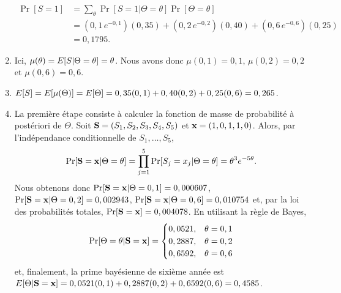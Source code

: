 \begin{exercice}
\begin{sol}
\begin{enumerate}
      \begin{align*}
        \Pr[S = 1] &= \sum_{\theta} \Pr[S=1|\Theta = \theta]
        \Pr[\Theta = \theta] \\
        &= (0,1\, e^{-0,1}) (0,35) + (0,2\, e^{-0,2}) (0,40) +
        (0,6\, e^{-0,6}) (0,25) \\
        &= 0,1795.
      \end{align*}
    \item Ici, $\mu(\theta) = E [ S|\Theta = \theta ] = \theta$. Nous
      avons donc $\mu(0,1) = 0,1$, $\mu(0,2) = 0,2$ et
      $\mu(0,6) = 0,6$.
    \item $E [ S ] = E [ \mu(\Theta) ] = E [ \Theta ] = 0,35 (0,1) +
      0,40 (0,2) + 0,25(0,6) = 0,265$.
    \item La première étape consiste à calculer la fonction de masse
      de probabilité à postériori de $\Theta$. Soit $\mathbf{S} = (S_1,
      S_2, S_3, S_4, S_5)$ et $\mathbf{x} = (1, 0, 1, 1, 0)$. Alors, par
      l'indépendance conditionnelle de $S_1, \dots, S_5$,
      \begin{equation*}
        \Pr[\mathbf{S} = \mathbf{x}|\Theta = \theta]
        = \prod_{j=1}^5 \Pr[S_j = x_j|\Theta = \theta]
        = \theta^3 e^{-5 \theta}.
      \end{equation*}
      Nous obtenons donc $\Pr[\mathbf{S} = \mathbf{x}|\Theta = 0,1] =
      0,000607$, $\Pr[\mathbf{S} = \mathbf{x}|\Theta = 0,2] = 0,002943$,
      $\Pr[\mathbf{S} = \mathbf{x}|\Theta = 0,6] = 0,010754$ et, par la loi
      des probabilités totales, $\Pr[\mathbf{S} = \mathbf{x}] =
      0,004078$. En utilisant la règle de Bayes,
      \begin{equation*}
        \Pr[\Theta = \theta|\mathbf{S} = \mathbf{x}] =
        \begin{cases}
          0,0521, & \theta = 0,1 \\
          0,2887, & \theta = 0,2 \\
          0,6592, & \theta = 0,6
        \end{cases}
      \end{equation*}
      et, finalement, la prime bayésienne de sixième année est
      $E [ \Theta|\mathbf{S} = \mathbf{x} ] = 0,0521(0,1) + 0,2887(0,2) +
      0,6592(0,6) = 0,4585$.
    \end{enumerate}
  \end{sol}
\end{exercice}

